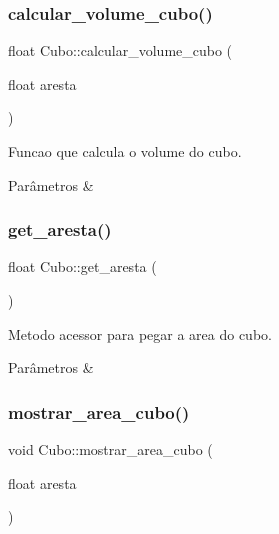 \subsubsection{\texorpdfstring{calcular\+\_\+volume\+\_\+cubo()}{calcular\_volume\_cubo()}}
{\footnotesize\ttfamily float Cubo\+::calcular\+\_\+volume\+\_\+cubo (\begin{DoxyParamCaption}\item[{float}]{aresta }\end{DoxyParamCaption})}



Funcao que calcula o volume do cubo. 


\begin{DoxyParams}{Parâmetros}
{\em } & \\
\hline
\end{DoxyParams}
\mbox{\label{classCubo_ad11623c0a6fe0d80f6c68bc38ad50095}} 
\subsubsection{\texorpdfstring{get\+\_\+aresta()}{get\_aresta()}}
{\footnotesize\ttfamily float Cubo\+::get\+\_\+aresta (\begin{DoxyParamCaption}{ }\end{DoxyParamCaption})}



Metodo acessor para pegar a area do cubo. 


\begin{DoxyParams}{Parâmetros}
{\em } & \\
\hline
\end{DoxyParams}
\mbox{\label{classCubo_aa0ad5a8f1b59b7f3265ef135a00c2c4e}} 
\subsubsection{\texorpdfstring{mostrar\+\_\+area\+\_\+cubo()}{mostrar\_area\_cubo()}}
{\footnotesize\ttfamily void Cubo\+::mostrar\+\_\+area\+\_\+cubo (\begin{DoxyParamCaption}\item[{float}]{aresta }\end{DoxyParamCaption})}



